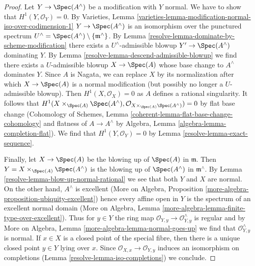 \begin{proof}

Let $Y \to \Spec(A^\wedge)$ be a modification with $Y$ normal.
We have to show that $H^1(Y, \mathcal{O}_Y) = 0$. By Varieties, Lemma
\ref{varieties-lemma-modification-normal-iso-over-codimension-1}
$Y \to \Spec(A^\wedge)$ is an isomorphism over the punctured
spectrum $U^\wedge = \Spec(A^\wedge) \setminus \{\mathfrak m^\wedge\}$.
By Lemma \ref{resolve-lemma-dominate-by-scheme-modification}
there exists a $U^\wedge$-admissible blowup $Y' \to \Spec(A^\wedge)$
dominating $Y$. By Lemma \ref{resolve-lemma-descend-admissible-blowup}
we find there exists a $U$-admissible blowup $X \to \Spec(A)$
whose base change to $A^\wedge$ dominates $Y$.
Since $A$ is Nagata, we can replace $X$ by its normalization
after which $X \to \Spec(A)$ is a normal modification (but
possibly no longer a $U$-admissible blowup).
Then $H^1(X, \mathcal{O}_X) = 0$ as $A$ defines a rational
singularity. It follows that
$H^1(X \times_{\Spec(A)} \Spec(A^\wedge),
\mathcal{O}_{X \times_{\Spec(A)} \Spec(A^\wedge)}) = 0$
by flat base change (Cohomology of Schemes, Lemma
\ref{coherent-lemma-flat-base-change-cohomology}
and flatness of $A \to A^\wedge$ by
Algebra, Lemma \ref{algebra-lemma-completion-flat}).
We find that $H^1(Y, \mathcal{O}_Y) = 0$ by
Lemma \ref{resolve-lemma-exact-sequence}.

\medskip\noindent
Finally, let $X \to \Spec(A)$ be the blowing up of $\Spec(A)$
in $\mathfrak m$. Then $Y = X \times_{\Spec(A)} \Spec(A^\wedge)$
is the blowing up of $\Spec(A^\wedge)$ in $\mathfrak m^\wedge$.
By Lemma \ref{resolve-lemma-blow-up-normal-rational} we see that both $Y$
and $X$ are normal. On the other hand, $A^\wedge$ is excellent
(More on Algebra, Proposition
\ref{more-algebra-proposition-ubiquity-excellent})
hence every affine open in $Y$ is the spectrum of an
excellent normal domain
(More on Algebra, Lemma \ref{more-algebra-lemma-finite-type-over-excellent}).
Thus for $y \in Y$ the ring map
$\mathcal{O}_{Y, y} \to \mathcal{O}_{Y, y}^\wedge$
is regular and by
More on Algebra, Lemma \ref{more-algebra-lemma-normal-goes-up}
we find that $\mathcal{O}_{Y, y}^\wedge$ is normal.
If $x \in X$ is a closed point of the special fibre,
then there is a unique closed point $y \in Y$ lying over $x$.
Since $\mathcal{O}_{X, x} \to \mathcal{O}_{Y, y}$ induces
an isomorphism on completions (Lemma \ref{resolve-lemma-iso-completions})
we conclude.
\end{proof}

